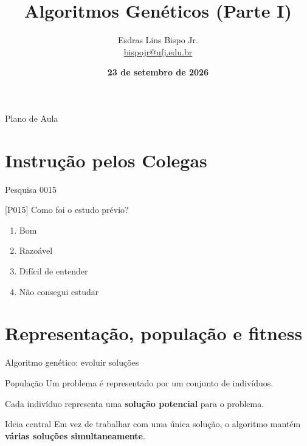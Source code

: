 \documentclass[xcolor=dvipsnames,table]{beamer}
\title{Algoritmos Genéticos (Parte I)}
\author{
  Esdras Lins Bispo Jr. \\ \url{bispojr@ufj.edu.br}
  }
\institute{
  Inteligência Artificial \\Bacharelado em Ciência da Computação}
\date{\textbf{23 de setembro de 2026} }
\begin{document}
	\begin{frame}
		\titlepage
	\end{frame}

	\AtBeginSection{
		\begin{frame}{Sumário}%
    		\tableofcontents[currentsection]
		\end{frame}
	}

	\begin{frame}{Plano de Aula}
		\tableofcontents
	\end{frame}
	
	\section{Instrução pelos Colegas}
	

    \begin{frame}{Pesquisa 0015}
		\begin{block}{[P015]}
			Como foi o estudo prévio?
		\end{block}
		\begin{enumerate}[label=(\Alph*)]
			\item Bom
			\item Razoável
			\item Difícil de entender
			\item Não consegui estudar
		\end{enumerate}
	\end{frame}

    \section{Representação, população e fitness}

    \begin{frame}{Algoritmo genético: evoluir soluções}

    \begin{block}{População}
        Um problema é representado por um conjunto de indivíduos.
        
        \medskip
        
        Cada indivíduo representa uma \textbf{solução potencial}
        para o problema.
    \end{block}

    \begin{center}
        \Large
    \end{center}

    \begin{block}{Ideia central}
        Em vez de trabalhar com uma única solução, o algoritmo
        mantém \textbf{várias soluções simultaneamente}.
    \end{block}

    \end{frame}
\end{document}
